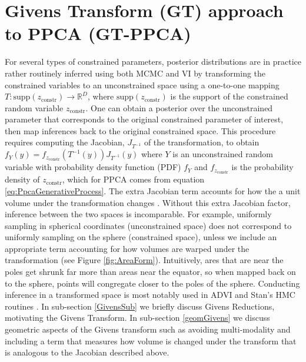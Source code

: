 \documentclass{article}
\begin{document}
\section{Givens Transform (GT) approach to PPCA (GT-PPCA)} \label{Givens}

For several types of constrained parameters, posterior distributions are in practice rather routinely inferred using both MCMC and VI by transforming the constrained variables to an unconstrained space using a one-to-one mapping $T: \mathrm{supp}(z_\mathrm{constr}) \to \mathbb{R}^D$, where $\mathrm{supp}(z_\mathrm{constr})$ is the support of the constrained random variable $z_\mathrm{constr}$. One can obtain a posterior over the unconstrained parameter that corresponds to the original constrained parameter of interest, then map inferences back to the original constrained space. This procedure requires computing the Jacobian, $J_{T^{-1}}$ of the transformation, to obtain $f_{Y}(y) = f_{z_\mathrm{constr}}(T^{-1}(y)) J_{T^{-1}}(y)$ where $Y$ is an unconstrained random variable with probability density function (PDF) $f_Y$ and $f_{z_\mathrm{constr}}$ is the probability density of $z_\mathrm{constr}$, which for PPCA comes from equation \ref{eq:PpcaGenerativeProcess}. The extra Jacobian term accounts for how the a unit volume under the transformation changes \citep{kucukelbir2014fully}. Without this extra Jacobian factor, inference between the two spaces is incomparable. For example, uniformly sampling in spherical coordinates (unconstrained space) does not correspond to uniformly sampling on the sphere (constrained space), unless we include an appropriate term accounting for how volumes are warped under the transformation (see Figure \ref{fig:AreaForm}). Intuitively, ares that are near the poles get shrunk far more than areas near the equator, so when mapped back on to the sphere, points will congregate closer to the poles of the sphere. Conducting inference in a transformed space is most notably used in ADVI and Stan's HMC routines \citep{carpenter2016stan, kucukelbir2014fully}. In sub-section \ref{GivensSub} we briefly discuss Givens Reductions, motivating the Givens Transform. In sub-section \ref{geomGivens} we discuss geometric aspects of the Givens transform such as avoiding multi-modality and including a term that measures how volume is changed under the transform that is analogous to the Jacobian described above.
\end{document}
